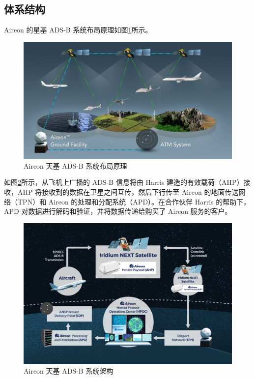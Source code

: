 \subsection{体系结构}

Aireon 的星基 ADS-B 系统布局原理如图\ref{fig:Aireon_GlobalSpaceBasedADSB_Coverage_Diagram}所示。

\begin{figure}[!htb]
\centering
\includegraphics[width=14cm]{pic/Aireon_GlobalSpaceBasedADSB_Coverage_Diagram-1024x576.jpg}
\caption{Aireon 天基 ADS-B 系统布局原理}
\label{fig:Aireon_GlobalSpaceBasedADSB_Coverage_Diagram}
\end{figure}

如图\ref{fig:System-Diagram-1024x693}所示，从飞机上广播的 ADS-B 信息将由 Harris 建造的有效载荷（AHP）接收，AHP 将接收到的数据在卫星之间互传，然后下行传至 Aireon 的地面传送网络（TPN）和 Aireon 的处理和分配系统（APD）。在合作伙伴 Harris 的帮助下，APD 对数据进行解码和验证，并将数据传递给购买了 Aireon 服务的客户。

\begin{figure}[!htb]
\centering
\includegraphics[width=13cm]{pic/System-Diagram-1024x693.jpg}
\caption{Aireon 天基 ADS-B 系统架构}
\label{fig:System-Diagram-1024x693}
\end{figure}

